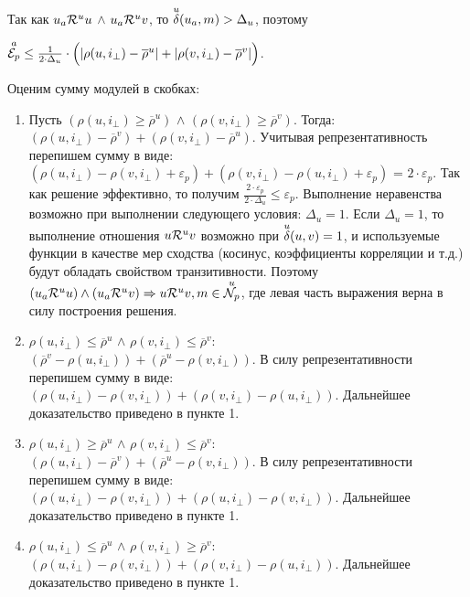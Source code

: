 Так как $u_a \mathcal{R}^u u$ $\wedge$ $u_a \mathcal{R}^u v$, то ${\overset{u}{\mathcal{\delta}}}(u_a, m) > \Delta_u$, поэтому

${\overset{a}{\mathcal{E}_{p}}} \le \frac{1}{2 \cdot \Delta_u} \cdot \Big(|\rho(u,i_{\bot}) - \overline{\rho}^u| + |\rho(v,i_{\bot}) - \overline{\rho}^v|\Big)$.

Оценим сумму модулей в скобках:
\begin{enumerate}
	\item Пусть $(\rho(u,i_{\bot}) \ge  \overline{\rho}^u)$ $\wedge$
		$(\rho(v,i_{\bot}) \ge  \overline{\rho}^v)$. Тогда: \\
		$(\rho(u,i_{\bot}) - \overline{\rho}^v) + (\rho(v,i_{\bot}) -
		\overline{\rho}^u)$.
		Учитывая репрезентативность перепишем
		сумму в виде: $(\rho(u,i_{\bot}) - \rho(v,i_{\bot}) + \varepsilon_p) +
		(\rho(v,i_{\bot}) - \rho(u,i_{\bot}) + \varepsilon_p)$ = $2 \cdot
		\varepsilon_p$.
		Так как решение
		эффективно, то получим $\frac{2 \cdot \varepsilon_p}{2 \cdot \Delta_u} \le \varepsilon_p$.
		Выполнение
		неравенства возможно при выполнении следующего условия:
		$\Delta_u = 1$. Если $\Delta_u = 1$, то выполнение отношения $u \mathcal{R}^u v$
		возможно при ${\overset{u}{\mathcal{\delta}}}(u, v) = 1$, и используемые функции в качестве
		мер сходства (косинус, коэффициенты корреляции и т.д.) будут обладать
		свойством транзитивности. Поэтому
		$(u_a \mathcal{R}^u u )\wedge (u_a \mathcal{R}^u v)  \Rightarrow u \mathcal{R}^u v, m \in {\overset{u}{\mathcal{N}_p}}$,
		где левая часть выражения верна в силу построения решения.

\item $\rho(u,i_{\bot}) \le  \overline{\rho}^u$ $\wedge$ $\rho(v,i_{\bot}) \le  \overline{\rho}^v$: \\
$(\overline{\rho}^v - \rho(u,i_{\bot})) + (\overline{\rho}^u - \rho(v,i_{\bot}))$. В силу репрезентативности перепишем
сумму в виде: $(\rho(u,i_{\bot}) - \rho(v,i_{\bot})) + (\rho(v,i_{\bot}) - \rho(u,i_{\bot}))$. Дальнейшее доказательство приведено в пункте 1.

\item $\rho(u,i_{\bot}) \ge  \overline{\rho}^u$ $\wedge$ $\rho(v,i_{\bot}) \le  \overline{\rho}^v$: \\
$(\rho(u,i_{\bot}) - \overline{\rho}^v) + (\overline{\rho}^u - \rho(v,i_{\bot}))$. В силу репрезентативности перепишем
сумму в виде: $(\rho(u,i_{\bot}) - \rho(v,i_{\bot})) + (\rho(u,i_{\bot}) - \rho(v,i_{\bot}))$. Дальнейшее доказательство приведено в пункте 1.

\item $\rho(u,i_{\bot}) \le  \overline{\rho}^u$ $\wedge$ $\rho(v,i_{\bot}) \ge  \overline{\rho}^v$: \\
$(\rho(u,i_{\bot}) - \rho(v,i_{\bot})) + (\rho(v,i_{\bot}) - \rho(u,i_{\bot}))$. Дальнейшее доказательство приведено в пункте 1.
\end{enumerate}

